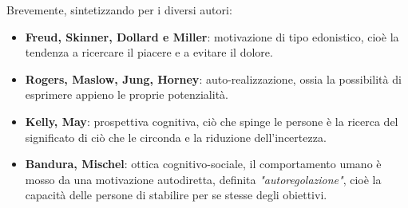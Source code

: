\documentclass{subfiles}
\begin{document}
Brevemente, sintetizzando per i diversi autori:
\begin{itemize}
    \item \textbf{Freud, Skinner, Dollard e Miller}: motivazione di tipo edonistico, cioè la tendenza a ricercare il piacere e a evitare il dolore.

    \item \textbf{Rogers, Maslow, Jung, Horney}: auto-realizzazione, ossia la possibilità di esprimere appieno le proprie potenzialità.

    \item \textbf{Kelly, May}: prospettiva cognitiva, ciò che spinge le persone è la ricerca del significato di ciò che le circonda e la riduzione dell'incertezza.

    \item \textbf{Bandura, Mischel}: ottica cognitivo-sociale, il comportamento umano è mosso da una motivazione autodiretta, definita \textit{"autoregolazione"},
          cioè la capacità delle persone di stabilire per se stesse degli obiettivi.
\end{itemize}
\end{document}
